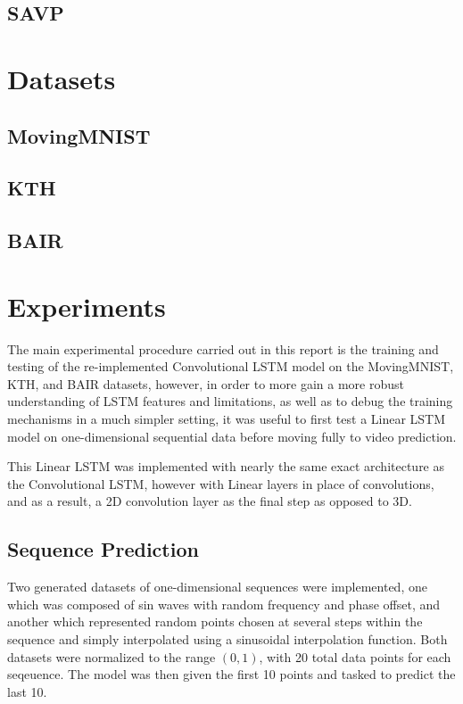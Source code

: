 \documentclass{scrartcl}
\begin{document}
\subsection{SAVP}
\label{subsec:savp}

\newpage
\section{Datasets}
\label{sec:datasets}

\subsection{MovingMNIST}
\label{subsec:mmnist}

\subsection{KTH}
\label{subsec:kth}

\subsection{BAIR}
\label{subsec:bair}

\newpage
\section{Experiments}
\label{sec:experiments}

The main experimental procedure carried out in this report is the training and
testing of the re-implemented Convolutional LSTM model on the MovingMNIST, KTH,
and BAIR datasets, however, in order to more gain a more robust understanding
of LSTM features and limitations, as well as to debug the training mechanisms
in a much simpler setting, it was useful to first test a Linear LSTM model on
one-dimensional sequential data before moving fully to video prediction.

This Linear LSTM was implemented with nearly the same exact architecture as the
Convolutional LSTM, however with Linear layers in place of convolutions, and as
a result, a 2D convolution layer as the final step as opposed to 3D.


\subsection{Sequence Prediction}
\label{subsec:experiment_sp}

Two generated datasets of one-dimensional sequences were implemented, one which
was composed of sin waves with random frequency and phase offset, and another
which represented random points chosen at several steps within the sequence and
simply interpolated using a sinusoidal interpolation function. Both datasets
were normalized to the range $(0, 1)$, with 20 total data points for each
seqeuence. The model was then given the first 10 points and tasked to predict
the last 10.
\end{document}
